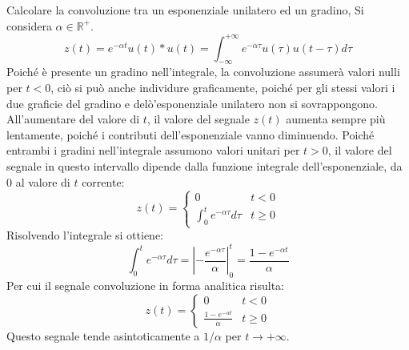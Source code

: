 \documentclass{article}
\numberwithin{equation}{subsection}
\begin{document}
Calcolare la convoluzione tra un esponenziale unilatero ed un gradino, 
Si considera $\alpha\in\mathbb{R}^+$. 
\begin{equation*}
    z(t)=e^{-\alpha t}u(t)*u(t)=\displaystyle\int_{-\infty}^{+\infty}e^{-\alpha\tau}u(\tau)u(t-\tau)d\tau
\end{equation*}
Poiché è presente un gradino nell'integrale, la convoluzione assumerà valori nulli per $t<0$, ciò si può anche individure graficamente, poiché per gli stessi valori i due 
graficie del gradino e delò'esponenziale unilatero non si sovrappongono. All'aumentare del valore di $t$, il valore del segnale $z(t)$ aumenta sempre più lentamente, poiché i 
contributi dell'esponenziale vanno diminuendo. Poiché entrambi i gradini nell'integrale assumono valori unitari per $t>0$, il valore del segnale in questo intervallo 
dipende dalla funzione integrale dell'esponenziale, da $0$ al valore di $t$ corrente:
\begin{equation*}
    z(t)=\begin{cases}
        0&t<0\\
        \displaystyle\int_0^te^{-\alpha \tau}d\tau&t\geq0
    \end{cases}
\end{equation*}
Risolvendo l'integrale si ottiene:
\begin{equation*}
    \displaystyle\int_0^te^{-\alpha \tau}d\tau=\left|-\frac{e^{-\alpha\tau}}{\alpha}\right|^t_0=\frac{1-e^{-\alpha t}}{\alpha}
\end{equation*}
Per cui il segnale convoluzione in forma analitica risulta:
\begin{equation*}
    z(t)=\begin{cases}
        0&t<0\\
        \displaystyle\frac{1-e^{-\alpha t}}{\alpha}&t\geq0
    \end{cases}
\end{equation*}
Questo segnale tende asintoticamente a $1/\alpha$ per $t\to+\infty$. 
\end{document}
